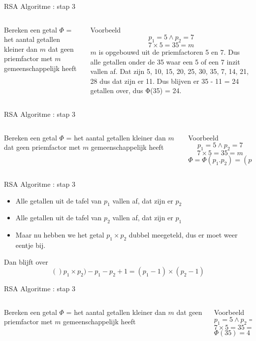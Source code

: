 \documentclass{beamer}
\begin{document}
\begin{frame}{RSA Algoritme : stap 3}
	\begin{columns}
		\begin{column}[T]{0.5\textwidth}
			Bereken een getal $\Phi$ =  het aantal getallen kleiner dan $m$ dat geen priemfactor met $m$ gemeenschappelijk heeft
		\end{column}
		\begin{column}[T]{0.5\textwidth}
			Voorbeeld
			\[ p_1 = 5 \wedge  p_2 = 7\]
			\[ 7 \times 5 = 35 = m \]
			$m$ is opgebouwd uit de priemfactoren 5 en 7. Dus alle getallen onder de 35 waar een 5 of een 7 inzit vallen af.  Dat zijn 5, 10, 15, 20, 25, 30, 35, 7, 14, 21, 28  dus dat zijn er 11. Dus blijven er 35 - 11 = 24 getallen over, dus Φ(35) = 24.
		\end{column}
	\end{columns}	
\end{frame}

\begin{frame}{RSA Algoritme : stap 3}
	\begin{columns}
		\begin{column}[T]{0.5\textwidth}
			Bereken een getal $\Phi$ =  het aantal getallen kleiner dan $m$ dat geen priemfactor met $m$ gemeenschappelijk heeft
		\end{column}
		\begin{column}[T]{0.5\textwidth}
			Voorbeeld
			\[ p_1 = 5 \wedge  p_2 = 7\]
			\[ 7 \times 5 = 35 = m \]
			\[ \Phi = \Phi(p_1 . p_2) = (p_1 -1) \times (p_2 -1) \]
		\end{column}
	\end{columns}	
\end{frame}

\begin{frame}{RSA Algoritme : stap 3}
	\begin{itemize}
		\item Alle getallen uit de tafel van $p_1$  vallen af, dat zijn er $p_2$
		\item Alle getallen uit de tafel van $p_2$ vallen af, dat zijn er $p_1$
		\item Maar nu hebben we het getal $p_1 \times p_2$  dubbel meegeteld, dus er moet weer eentje bij.
	\end{itemize}
	
	Dan blijft over  
	\[ ()p_1 \times p_2) - p_1 - p_2 + 1  =   (p_1 - 1)\times(p_2 - 1) \]
\end{frame}

\begin{frame}{RSA Algoritme : stap 3}
	\begin{columns}
		\begin{column}[T]{0.5\textwidth}
			Bereken een getal $\Phi$ =  het aantal getallen kleiner dan $m$ dat geen priemfactor met $m$ gemeenschappelijk heeft
		\end{column}
		\begin{column}[T]{0.5\textwidth}
			Voorbeeld
			\[ p_1 = 5 \wedge  p_2 = 7\]
			\[ 7 \times 5 = 35 = m \]
			\[ \Phi(35) =4 \times 6 = 24 \]
		\end{column}
	\end{columns}	
\end{frame}
\end{document}
